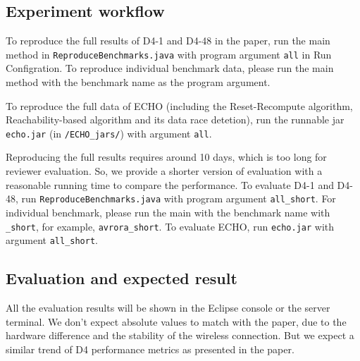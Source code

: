 \documentclass[preprint, number, 10pt]{sigplanconf}
\begin{document}
\subsection{Experiment workflow}
To reproduce the full results of D4-1 and D4-48 in the paper, run the main method in \texttt{ReproduceBenchmarks.java} with program argument \texttt{all} in Run Configration. To reproduce individual benchmark data, please run the main method with the benchmark name as the program argument. 

To reproduce the full data of ECHO (including the Reset-Recompute algorithm, Reachability-based algorithm and its data race detetion), run the runnable jar \texttt{echo.jar} (in \texttt{/ECHO\_jars/}) with argument \texttt{all}.

Reproducing the full results requires around 10 days, which is too long for reviewer evaluation. So, we provide a shorter version of evaluation with a reasonable running time to compare the performance. To evaluate D4-1 and D4-48, run \texttt{ReproduceBenchmarks.java} with program argument \texttt{all\_short}. For individual benchmark, please run the main with the benchmark name with \texttt{\_short}, for example, \texttt{avrora\_short}. To evaluate ECHO, run \texttt{echo.jar} with argument \texttt{all\_short}.

\subsection{Evaluation and expected result}
All the evaluation results will be shown in the Eclipse console or the server terminal. We don't expect absolute values to match with the paper, due to the hardware difference and the stability of the wireless connection. But we expect a similar trend of D4 performance metrics as presented in the paper.
\end{document}
